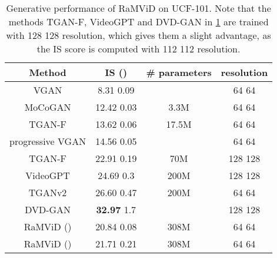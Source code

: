 \documentclass[10pt]{article} \usepackage[accepted]{tmlr}
\begin{document}
\begin{table}
    \centering
    \caption{Generative performance of RaMViD on UCF-101. Note that the methods TGAN-F, VideoGPT and DVD-GAN in \cref{tab:ucf_is} are trained with 128  128 resolution, which gives them a slight advantage, as the IS score is computed with 112  112 resolution.}
    \begin{tabular}{cccc}
        \toprule
        \textbf{Method} &  \textbf{IS} () & \textbf{\# parameters} & \textbf{resolution} \\
        \midrule
        VGAN \citep{vondrick_2016_vgan} & 8.31  0.09 & & 64  64 \\
        MoCoGAN \citep{Tulyakov_2018_CVPR} & 12.42  0.03 & 3.3M & 64  64\\
        TGAN-F \citep{KAHEMBWE2020506} & 13.62  0.06 & 17.5M & 64  64\\
        progressive VGAN \citep{acharya_2018_prgan} & 14.56  0.05 & & 64  64\\
        TGAN-F \citep{KAHEMBWE2020506} & 22.91  0.19 & 70M & 128  128\\
        VideoGPT \citep{yan_2021}& 24.69  0.3 & 200M & 128  128\\
        TGANv2 \citep{Saito_2020}& 26.60  0.47 & 200M & 64  64\\
        DVD-GAN \citep{clark_2019_dvd_gan} & \textbf{32.97}  1.7 & & 128  128\\
        \midrule 
        RaMViD () & 20.84  0.08 & 308M & 64  64 \\
        RaMViD () & 21.71  0.21 & 308M & 64  64\\
        \bottomrule
    \end{tabular}
    \label{tab:ucf_is}
\end{table}
\end{document}
